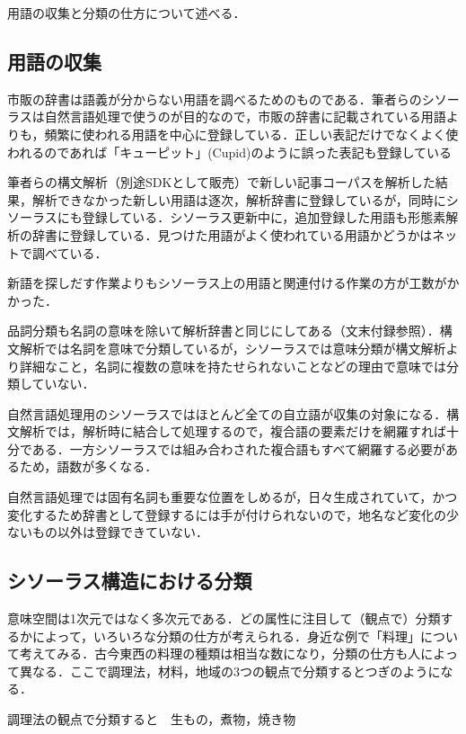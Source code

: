 \documentclass[japanese]{jnlp_1.4}
\begin{document}
用語の収集と分類の仕方について述べる．


\subsection{用語の収集}

市販の辞書は語義が分からない用語を調べるためのものである．筆者らのシソーラスは自然言語処理で使うのが目的なので，市販の辞書に記載されている用語よりも，頻繁に使われる用語を中心に登録している．正しい表記だけでなくよく使われるのであれば「キューピット」(Cupid)のように誤った表記も登録している

筆者らの構文解析（別途SDKとして販売）で新しい記事コーパスを解析した結果，解析できなかった新しい用語は逐次，解析辞書に登録しているが，同時にシソーラスにも登録している．シソーラス更新中に，追加登録した用語も形態素解析の辞書に登録している．見つけた用語がよく使われている用語かどうかはネットで調べている．

新語を探しだす作業よりもシソーラス上の用語と関連付ける作業の方が工数がかかった．

品詞分類も名詞の意味を除いて解析辞書と同じにしてある（文末付録参照）．構文解析では名詞を意味で分類しているが，シソーラスでは意味分類が構文解析より詳細なこと，名詞に複数の意味を持たせられないことなどの理由で意味では分類していない．

自然言語処理用のシソーラスではほとんど全ての自立語が収集の対象になる．構文解析では，解析時に結合して処理するので，複合語の要素だけを網羅すれば十分である．一方シソーラスでは組み合わされた複合語もすべて網羅する必要があるため，語数が多くなる．

自然言語処理では固有名詞も重要な位置をしめるが，日々生成されていて，かつ変化するため辞書として登録するには手が付けられないので，地名など変化の少ないもの以外は登録できていない．



\subsection{シソーラス構造における分類}


意味空間は1次元ではなく多次元である．どの属性に注目して（観点で）分類するかによって，いろいろな分類の仕方が考えられる．身近な例で「料理」について考えてみる．古今東西の料理の種類は相当な数になり，分類の仕方も人によって異なる．ここで調理法，材料，地域の3つの観点で分類するとつぎのようになる．

調理法の観点で分類すると　生もの，煮物，焼き物
\end{document}
